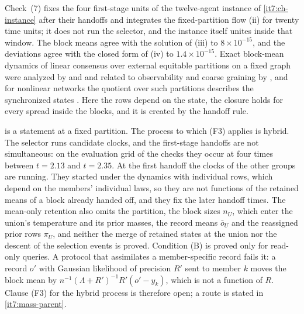 \documentclass[11pt,letterpaper]{report}
\begin{document}
Check~(7) fixes the four first-stage units of the twelve-agent instance of \cref{it7:ch-instance} after their handoffs and integrates the fixed-partition flow (ii) for twenty time units; it does not run the selector, and the instance itself unites inside that window. The block means agree with the solution of (iii) to $8\times10^{-15}$, and the deviations agree with the closed form of (iv) to $1.4\times10^{-15}$. Exact block-mean dynamics of linear consensus over external equitable partitions on a fixed graph were analyzed by \citet{MartiniEgerstedtBicchi2010} and \citet{EgerstedtEtAl2012} and related to observability and coarse graining by \citet{OClery2013}, and for nonlinear networks the quotient over such partitions describes the synchronized states \citep{SchaubEtAl2016}. Here the rows depend on the state, the closure holds for every spread inside the blocks, and it is created by the handoff rule.

 is a statement at a fixed partition. The process to which (F3) applies is hybrid. The selector runs candidate clocks, and the first-stage handoffs are not simultaneous: on the evaluation grid of the checks they occur at four times between $t=2.13$ and $t=2.35$. At the first handoff the clocks of the other groups are running. They started under the dynamics with individual rows, which depend on the members' individual laws, so they are not functions of the retained means of a block already handed off, and they fix the later handoff times. The mean-only retention also omits the partition, the block sizes $n_U$, which enter the union's temperature and its prior masses, the record means $\bar o_U$ and the reassigned prior rows $\pi_U$, and neither the merge of retained states at the union nor the descent of the selection events is proved. Condition (B) is proved only for read-only queries. A protocol that assimilates a member-specific record fails it: a record $o'$ with Gaussian likelihood of precision $R'$ sent to member $k$ moves the block mean by $n^{-1}(\Lambda+R')^{-1}R'(o'-y_k)$, which is not a function of $R$. Clause (F3) for the hybrid process is therefore open; a route is stated in \cref{it7:mass-parent}.
\end{document}
